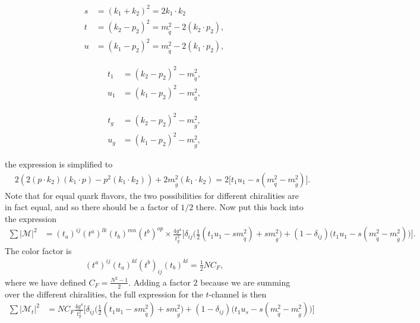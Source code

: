 \documentclass[11pt]{article}
\begin{document}
\begin{flushleft}
\begin{multicols}{3}
\begin{align*}
s &= (k_1 + k_2)^2 = 2 k_1 \cdot k_2\\
t &= (k_2-p_2)^2 = m_{\tilde{q}}^2 - 2 (k_2 \cdot p_2),\\
u &= (k_1 - p_2)^2 = m_{\tilde{q}}^2 - 2 (k_1 \cdot p_2),
\end{align*}

\begin{align*}
t_1 &= (k_2-p_2)^2 - m_{\tilde{q}}^2,\\
u_1 &= (k_1-p_2)^2 - m_{\tilde{q}}^2,
\end{align*}

\begin{align*}
t_g &= (k_2-p_2)^2 - m_{\tilde{g}}^2,\\
u_g &= (k_1-p_2)^2 - m_{\tilde{g}}^2,
\end{align*}

\end{multicols}
the expression is simplified to
\begin{align*}
&2(2 (p \cdot k_2) (k_1 \cdot p) - p^2 (k_1 \cdot k_2) ) + 2m_{\tilde{g}}^2 (k_1 \cdot k_2) =  2 \big[t_1u_1 -s(m_{\tilde{q}}^2 - m_{\tilde{g}}^2) \big].
\end{align*}
Note that for equal quark flavors, the two possibilities for different chiralities are in fact equal, and so there should be a factor of $1/2$ there. Now put this back into the expression 
\begin{align*}
\sum |\mathcal{M}|^2 &=   (t_a)^{ij} (t^a)^{lk} (t_b)^{mn} (t^b)^{op}  \times\frac{4 g^4}{t_g^2} \Big[\delta_{ij} \big(\frac{1}{2}(t_1u_1 -sm_{\tilde{q}}^2)+  sm_{\tilde{g}}^2 \big) + (1-\delta_{ij})\big(t_1u_1 -s(m_{\tilde{q}}^2- m_{\tilde{g}}^2) \big)\Big].
\end{align*}
The color factor is
\begin{align*}
(t^a)^{ij}(t_a)^{kl}(t^b)_{ij}(t_b)^{kl} = \frac{1}{2}NC_F,
\end{align*}
where we have defined $C_F = \frac{N^2 -1}{2}$. Adding a factor $2$ because we are summing over the different chiralities, the full expression for the $t$-channel is then
\begin{align*}
\sum |\mathcal{M}_t|^2 &= NC_F \frac{4g^4}{t_g^2} \Big[ \delta_{ij} \big(\frac{1}{2}(t_1u_1-sm_{\tilde{q}}^2) + sm_{\tilde{g}}^2 \big) + (1-\delta_{ij}) \big(t_1u_s - s(m_{\tilde{q}}^2 - m_{\tilde{g}}^2) \big)\Big]
\end{align*}
\end{flushleft}
\end{document}
